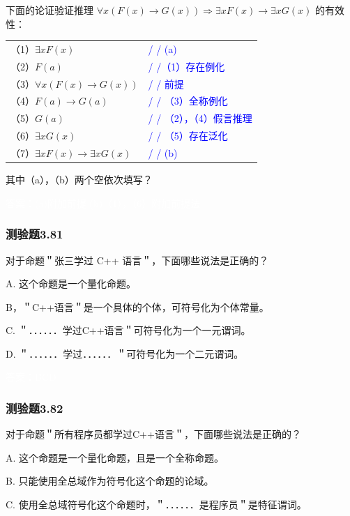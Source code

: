 \documentclass[UTF8, heading=true]{ctexart}
\begin{document}
下面的论证验证推理 $\forall x(F(x) \rightarrow G(x)) \Longrightarrow \exists x F(x) \rightarrow \exists x G(x)$ 的有效性：
\begin{table}[H]
  \centering
  \renewcommand{\arraystretch}{1.5}
\begin{tabular}{ll}
（1）$\exists x F(x)$ & \textcolor{blue}{/ / (a)} \\
（2）$F(a)$ & \textcolor{blue}{/ /（1）存在例化} \\
（3）$\forall x(F(x) \rightarrow G(x))$ & \textcolor{blue}{/ / 前提} \\
（4）$F(a) \rightarrow G(a)$ & \textcolor{blue}{/ / （3）全称例化} \\
（5）$G(a)$ & \textcolor{blue}{/ / （2），（4）假言推理} \\
（6）$\exists x G(x)$ & \textcolor{blue}{/ / （5）存在泛化} \\
（7）$\exists x F(x) \rightarrow \exists x G(x)$ & \textcolor{blue}{/ / (b)}
\end{tabular}
\end{table}

其中（a），（b）两个空依次填写？

\textcolor{white}{答案：(a)附加前提 (b)（1），（6）附加前提法}

\subsubsection{测验题3.81}

对于命题＂张三学过 C++ 语言＂，下面哪些说法是正确的？

A. 这个命题是一个量化命题。

B，＂C++语言＂是一个具体的个体，可符号化为个体常量。

C. ＂．．．．．．学过C++语言＂可符号化为一个一元谓词。

D.  ＂．．．．．．学过．．．．．．＂可符号化为一个二元谓词。

\textcolor{white}{答案：BCD}

\subsubsection{测验题3.82}

对于命题＂所有程序员都学过C++语言＂，下面哪些说法是正确的？

A. 
这个命题是一个量化命题，且是一个全称命题。

B. 
只能使用全总域作为符号化这个命题的论域。

C. 
使用全总域符号化这个命题时，＂．．．．．．是程序员＂是特征谓词。
\end{document}
